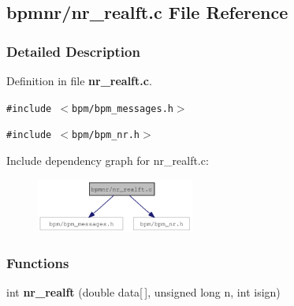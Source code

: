 \subsection{bpmnr/nr\_\-realft.c File Reference}
\label{nr__realft_8c}


\subsubsection{Detailed Description}


Definition in file {\bf nr\_\-realft.c}.

{\tt \#include $<$bpm/bpm\_\-messages.h$>$}\par
{\tt \#include $<$bpm/bpm\_\-nr.h$>$}\par


Include dependency graph for nr\_\-realft.c:\nopagebreak
\begin{figure}[H]
\begin{center}
\leavevmode
\includegraphics[width=147pt]{nr__realft_8c__incl}
\end{center}
\end{figure}
\subsubsection*{Functions}
\begin{CompactItemize}
\item 
int {\bf nr\_\-realft} (double data[$\,$], unsigned long n, int isign)
\end{CompactItemize}
